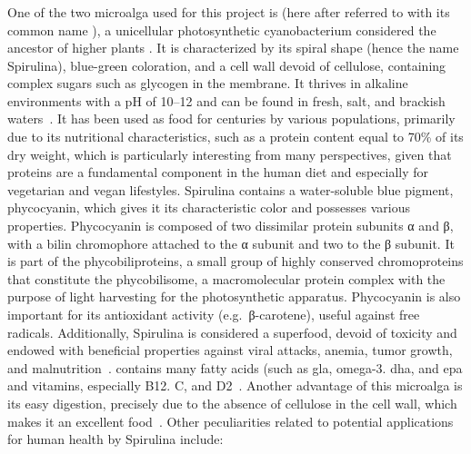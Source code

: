 \subsubsection{}
One of the two microalga used for this project is  (here after referred to with its common name ), a unicellular photosynthetic cyanobacterium considered the ancestor of higher plants . It is characterized by its spiral shape (hence the name Spirulina), blue-green coloration, and a cell wall devoid of cellulose, containing complex sugars such as glycogen in the membrane. It thrives in alkaline environments with a pH of \numrange[range-phrase={--}]{10}{12} and can be found in fresh, salt, and brackish waters~\parencite{mohan_spirulina_2014}. It has been used as food for centuries by various populations, primarily due to its nutritional characteristics, such as a protein content equal to \num{70}\% of its dry weight, which is particularly interesting from many perspectives, given that proteins are a fundamental component in the human diet and especially for vegetarian and vegan lifestyles. Spirulina contains a water-soluble blue pigment, phycocyanin, which gives it its characteristic color and possesses various properties. Phycocyanin is composed of two dissimilar protein subunits α and β, with a bilin chromophore attached to the α subunit and two to the β subunit. It is part of the phycobiliproteins, a small group of highly conserved chromoproteins that constitute the phycobilisome, a macromolecular protein complex with the purpose of light harvesting for the photosynthetic apparatus. Phycocyanin is also important for its antioxidant activity (e.g.~β-carotene), useful against free radicals. Additionally, Spirulina is considered a superfood, devoid of toxicity and endowed with beneficial properties against viral attacks, anemia, tumor growth, and malnutrition~\parencite{saranraj_spirulina_2014}.  contains many fatty acids (such as \gls{gla}, omega-3. \gls{dha}, and \gls{epa} and vitamins, especially B12. C, and D2~\parencite{moons_drivers_2017}. Another advantage of this microalga is its easy digestion, precisely due to the absence of cellulose in the cell wall, which makes it an excellent food~\parencite{mohammadi_Spirulina_2022}. Other peculiarities related to potential applications for human health by Spirulina include:
